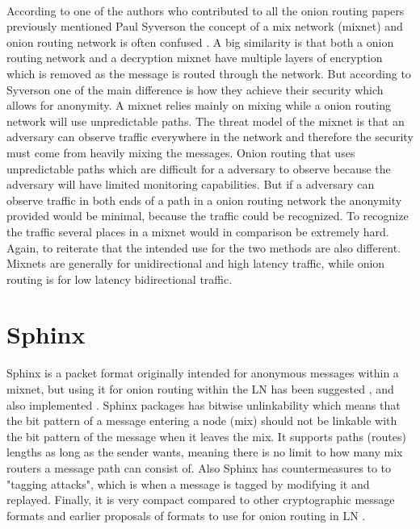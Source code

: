 \documentclass[informationsecurity]{gucmasterproject}
\begin{document}
\paragraph{}
According to one of the authors who contributed to all the onion routing papers previously mentioned Paul Syverson the concept of a mix network (mixnet) and onion routing network is often confused \cite{syverson2009m}.
A big similarity is that both a onion routing network and a decryption mixnet have multiple layers of encryption which is removed as the message is routed through the network.
But according to Syverson one of the main difference is how they achieve their security which allows for anonymity. 
A mixnet relies mainly on mixing while a onion routing network will use unpredictable paths. The threat model of the mixnet is that an adversary can observe traffic everywhere in the network and therefore the security must come from heavily mixing the messages. Onion routing that uses unpredictable paths which are difficult for a adversary to observe because the adversary will have limited monitoring capabilities. But if a adversary can observe traffic in both ends of a path in a onion routing network the anonymity provided would be minimal, because the traffic could be recognized. To recognize the traffic several places in a mixnet would in comparison be extremely hard. Again, to reiterate that the intended use for the two methods are also different. Mixnets are generally for unidirectional and high latency traffic, while onion routing is for low latency bidirectional traffic.

\section{Sphinx}

Sphinx \cite{danezis2009sphinx} is a packet format originally intended for anonymous messages within a mixnet, but using it for onion routing within the LN has been suggested \cite{LNDM_onion} \cite{SB_onion}, and also implemented \cite{LN_onion_implementation}.
Sphinx packages has bitwise unlinkability which means that the bit pattern of a message entering a node (mix) should not be linkable with the bit pattern of the message when it leaves the mix. It supports paths (routes) lengths as long as the sender wants, meaning there is no limit to how many mix routers a message path can consist of. Also Sphinx has countermeasures to to "tagging attacks", which is when a message is tagged by modifying it and replayed. Finally, it is very compact compared to other cryptographic message formats and earlier proposals of formats to use for onion routing in LN \cite{LNDM_onion}.
\end{document}
